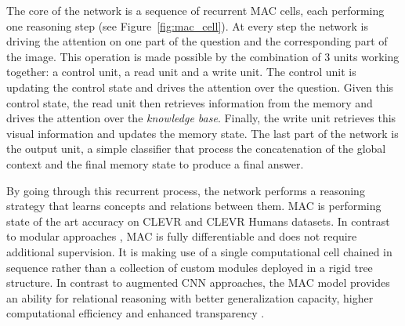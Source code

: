 The core of the network is a sequence of recurrent MAC cells, each performing one reasoning step (see Figure~\ref{fig:mac_cell}). At every step the network is driving the attention on one part of the question and the corresponding part of the image. This operation is made possible by the combination of 3 units working together: a control unit, a read unit and a write unit. The control unit is updating the control state and drives the attention over the question. Given this control state, the read unit then retrieves information from the memory and drives the attention over the  \emph{knowledge base}.
Finally, the write unit retrieves this visual information and updates the memory state.
The last part of the network is the output unit,  a simple classifier that process the concatenation of the global context  and the final memory state to produce a final answer.

By going through this recurrent process, the network performs a reasoning strategy that learns concepts and relations between them. MAC is performing state of the art accuracy on CLEVR and CLEVR Humans datasets.
In contrast to modular approaches \cite{andreas2016learning,hu2017learning,johnson2017inferring}, MAC is fully
differentiable and does not require additional supervision. It is making use of a single computational cell chained in sequence rather than a collection of custom modules deployed in a rigid tree structure.
In contrast to augmented CNN approaches, the MAC model provides an ability for relational reasoning with better generalization capacity, higher
computational efficiency and enhanced transparency \cite{hudson2018compositional}.

